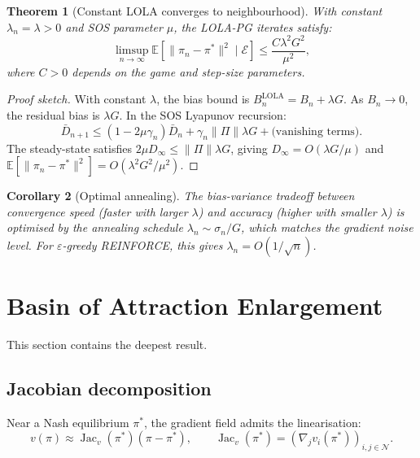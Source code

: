 \documentclass[11pt,a4paper]{article}
\newtheorem{theorem}{Theorem}[section]
\newtheorem{corollary}[theorem]{Corollary}
\DeclareMathOperator{\Jac}{Jac}
\newcommand{\E}{\mathbb{E}}
\newcommand{\cE}{\mathcal{E}}
\begin{document}
\begin{theorem}[Constant LOLA converges to neighbourhood]
\label{thm:constant}
With constant $\lambda_n = \lambda > 0$ and SOS parameter $\mu$, the LOLA-PG iterates satisfy:
\begin{equation}
\label{eq:neighborhood}
    \limsup_{n \to \infty} \E[\|\pi_n - \pi^*\|^2 \mid \cE] \leq \frac{C \lambda^2 G^2}{\mu^2},
\end{equation}
where $C > 0$ depends on the game and step-size parameters.
\end{theorem}

\begin{proof}[Proof sketch]
With constant $\lambda$, the bias bound is $B_n^{\mathrm{LOLA}} = B_n + \lambda G$. As $B_n \to 0$, the residual bias is $\lambda G$. In the SOS Lyapunov recursion:
\[
    \bar{D}_{n+1} \leq (1 - 2\mu\gamma_n)\bar{D}_n + \gamma_n \|\Pi\| \lambda G + \text{(vanishing terms)}.
\]
The steady-state satisfies $2\mu D_\infty \leq \|\Pi\| \lambda G$, giving $D_\infty = O(\lambda G / \mu)$ and $\E[\|\pi_n - \pi^*\|^2] = O(\lambda^2 G^2 / \mu^2)$.
\end{proof}

\begin{corollary}[Optimal annealing]
\label{cor:optimal-anneal}
The bias-variance tradeoff between convergence speed (faster with larger $\lambda$) and accuracy (higher with smaller $\lambda$) is optimised by the annealing schedule $\lambda_n \sim \sigma_n / G$, which matches the gradient noise level. For $\varepsilon$-greedy REINFORCE, this gives $\lambda_n = O(1/\sqrt{n})$.
\end{corollary}


\section{Basin of Attraction Enlargement}
\label{sec:basin}

This section contains the deepest result.

\subsection{Jacobian decomposition}

Near a Nash equilibrium $\pi^*$, the gradient field admits the linearisation:
\begin{equation}
    v(\pi) \approx \Jac_v(\pi^*)(\pi - \pi^*), \qquad \Jac_v(\pi^*) = (\nabla_j v_i(\pi^*))_{i,j \in \mathcal{N}}.
\end{equation}
\end{document}
